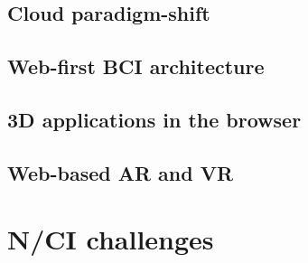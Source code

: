 
\subsection{Cloud paradigm-shift}
\label{chapter2-cloud-paradigm-shift}


\subsection{Web-first BCI architecture}
\label{chapter2-web-first-bci-architecture}


\subsection{3D applications in the browser}
\label{chapter2-3d-applications-in-the-browser}


\subsection{Web-based AR and VR}
\label{chapter2-web-based-ar-and-vr}


\section{N/CI challenges}
\label{chapter2-nci-challenges}



